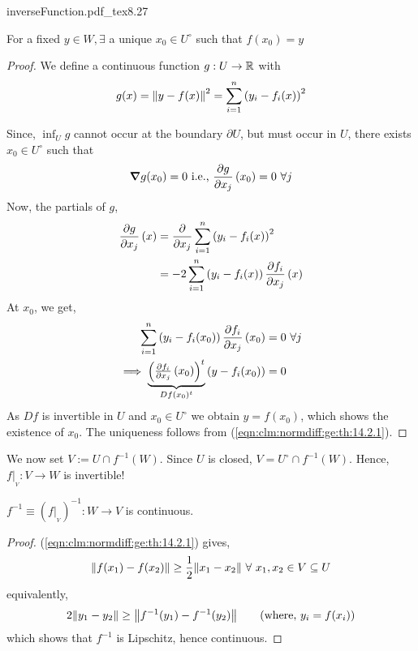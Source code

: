 \documentclass[../Analysis-3.tex]{subfiles}
\begin{document}
\begin{proofFig}{\def\svgwidth{1.4in}
    {inverseFunction.pdf_tex}}{}{\label{fig:inf:fun}}{8}{.27\textwidth}
  \begin{clmBox}
    For a fixed $ y \in W, \exists$ a unique $ x_0 \in U^{\circ} $ such that $ f(x_0) = y $
  \end{clmBox}

  \begin{proof}
    We define a continuous function $ g:U \to \mathbb{R} $ with \[ g(x) = \norm{y-f(x)}^2 = \sum_{i=1}^{n}\left( y_i - f_i(x) \right)^2 \]

    Since, $ \inf_U g $ cannot occur at the boundary $ \partial U $, but must occur in $ U $, there exists $ x_0 \in U^{\circ} $ such that
    \[\grad g(x_0) = 0 \text{ i.e., } \pdv{g}{x_j}\left( x_0 \right) = 0 \ \forall j \]
    Now, the partials of $ g $,
    \begin{align*}
      \pdv{g}{x_j}\left( x \right)
       & = \pdv{x_j} \sum_{i=1}^{n}\left( y_i - f_i(x) \right)^2                     \\
       & = -2\sum_{i=1}^{n}\left( y_i - f_i(x) \right)\pdv{f_i}{x_j}\left( x \right)
    \end{align*}
    At $ x_0 $, we get,
    \begin{align*}
      \sum_{i=1}^{n}\left( y_i - f_i(x_0) \right)\pdv{f_i}{x_j}\left( x_0 \right) & = 0 \ \forall j          \\
      \implies \underbrace{\begin{pmatrix}
                               \pdv{f_i}{x_j}\left( x_0 \right)
                             \end{pmatrix}^t}_{Df(x_0)^t} \left( y-f_i(x_0) \right)                      & = 0
    \end{align*}
    As $ Df $ is invertible in $ U $ and $ x_0 \in U^{\circ} $ we obtain $ y = f(x_0) $, which shows the existence of $ x_0 $. The uniqueness follows from (\ref{eqn:clm:normdiff:ge:th:14.2.1}).
  \end{proof}

  We now set $ V := U \cap f^{-1}(W) $. Since $ U $ is closed, $ V = U^{\circ} \cap f^{-1}(W) $. Hence, $ f\vert_{{}_V}: V \to W $ is invertible!


  \begin{clmBox}
    $ f^{-1} \equiv \left( f\vert_{{}_V} \right)^{-1}:W \to V $ is continuous.
  \end{clmBox}

  \begin{proof}
    (\ref{eqn:clm:normdiff:ge:th:14.2.1}) gives,
    \[  \norm{f(x_1) - f(x_2)} \geq \frac{1}{2}\norm{x_1 - x_2} \ \forall\ x_1,x_2 \in V \subseteq U  \]
    equivalently,
    \[  2\norm{y_1 - y_2} \geq \norm{f^{-1}(y_1) - f^{-1}(y_2)}   \tag{where, $ y_i = f(x_i) $}  \]
    which shows that $ f^{-1} $ is Lipschitz, hence continuous.
  \end{proof}



\end{proofFig}
\end{document}
